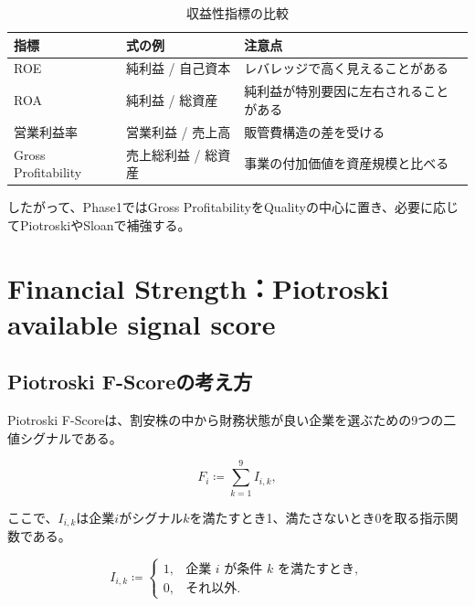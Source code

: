 \documentclass[11pt,a4paper]{article}
\begin{document}
\begin{table}[tbp]
\caption{収益性指標の比較}
\label{tab:profitability-compare}
\centering
\small
\begin{tabularx}{\linewidth}{p{25mm}p{38mm}Y}
\toprule
指標 & 式の例 & 注意点 \\
\midrule
ROE & 純利益 / 自己資本 & レバレッジで高く見えることがある \\
ROA & 純利益 / 総資産 & 純利益が特別要因に左右されることがある \\
営業利益率 & 営業利益 / 売上高 & 販管費構造の差を受ける \\
Gross Profitability & 売上総利益 / 総資産 & 事業の付加価値を資産規模と比べる \\
\bottomrule
\end{tabularx}
\end{table}

したがって、Phase1ではGross ProfitabilityをQualityの中心に置き、必要に応じてPiotroskiやSloanで補強する。


\clearpage
\section{Financial Strength：Piotroski available signal score}

\subsection{Piotroski F-Scoreの考え方}

Piotroski F-Scoreは、割安株の中から財務状態が良い企業を選ぶための9つの二値シグナルである。

\begin{equation}
F_i \coloneqq \sum_{k=1}^{9} I_{i,k},
\label{eq:piotroski}
\end{equation}

ここで、$I_{i,k}$は企業$i$がシグナル$k$を満たすとき1、満たさないとき0を取る指示関数である。

\begin{equation}
I_{i,k} \coloneqq
\begin{cases}
1, & \text{企業 } i \text{ が条件 } k \text{ を満たすとき},\\
0, & \text{それ以外}.
\end{cases}
\label{eq:indicator}
\end{equation}
\end{document}
